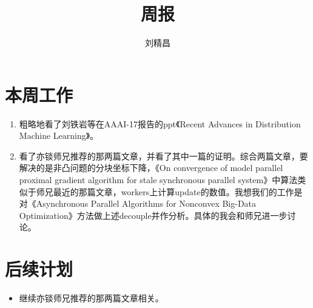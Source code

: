 \documentclass{ctexart}
\begin{document}
\title{周报}
\author{刘精昌}
\maketitle

\fangsong
\section*{本周工作}
\begin{enumerate}
  \item 粗略地看了刘铁岩等在AAAI-17报告的ppt《Recent Advances in Distribution Machine Learning》。
  \item 看了亦锬师兄推荐的那两篇文章，并看了其中一篇的证明。综合两篇文章，要解决的是非凸问题的分块坐标下降，《On convergence of model parallel proximal gradient algorithm for stale synchronous parallel system》中算法类似于师兄最近的那篇文章，workers上计算update的数值。我想我们的工作是对《Asynchronous Parallel Algorithms for Nonconvex Big-Data Optimization》方法做上述decouple并作分析。具体的我会和师兄进一步讨论。
\end{enumerate}

\section*{后续计划}
\begin{itemize}
    \item 继续亦锬师兄推荐的那两篇文章相关。
\end{itemize}
\end{document}

